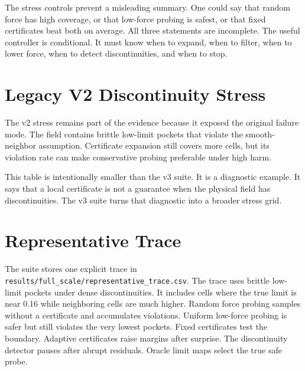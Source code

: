\documentclass{article}
\begin{document}
\begin{table}[h]
\centering
\scriptsize
{}
\caption{Stress controls. The table includes smooth, discontinuous, noisy,
high-harm, free-safe, brittle-pocket, and soft-contact conditions.}
\label{tab:stress}
\end{table}

The stress controls prevent a misleading summary. One could say that random
force has high coverage, or that low-force probing is safest, or that fixed
certificates beat both on average. All three statements are incomplete. The
useful controller is conditional. It must know when to expand, when to filter,
when to lower force, when to detect discontinuities, and when to stop.

\section{Legacy V2 Discontinuity Stress}

The v2 stress remains part of the evidence because it exposed the original
failure mode. The field contains brittle low-limit pockets that violate the
smooth-neighbor assumption. Certificate expansion still covers more cells, but
its violation rate can make conservative probing preferable under high harm.



This table is intentionally smaller than the v3 suite. It is a diagnostic
example. It says that a local certificate is not a guarantee when the physical
field has discontinuities. The v3 suite turns that diagnostic into a broader
stress grid.

\section{Representative Trace}

The suite stores one explicit trace in
\texttt{results/full\_scale/representative\_trace.csv}. The trace uses brittle
low-limit pockets under dense discontinuities. It includes cells where the true
limit is near 0.16 while neighboring cells are much higher. Random force
probing samples without a certificate and accumulates violations. Uniform
low-force probing is safer but still violates the very lowest pockets. Fixed
certificates test the boundary. Adaptive certificates raise margins after
surprise. The discontinuity detector pauses after abrupt residuals. Oracle
limit maps select the true safe probe.
\end{document}
